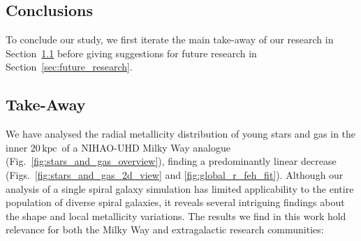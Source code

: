 \documentclass[twocolumn,apj,numberedappendix,appendixfloats,twocolappendix]{openjournal}
\newcommand{\nihaoRmax}{$20\,\mathrm{kpc}$}
\begin{document}
\begin{CJK*}{UTF8}{gbsn}
\section{Conclusions}
\label{sec:conc}

To conclude our study, we first iterate the main take-away of our research in Section~\ref{sec:take_away} before giving suggestions for future research in Section~\ref{sec:future_research}.

\subsection{Take-Away} \label{sec:take_away}

We have analysed the radial metallicity distribution of young stars and gas in the inner \nihaoRmax\ of a NIHAO-UHD Milky Way analogue (Fig.~\ref{fig:stars_and_gas_overview}), finding a predominantly linear decrease (Figs.~\ref{fig:stars_and_gas_2d_view} and \ref{fig:global_r_feh_fit}). Although our analysis of a single spiral galaxy simulation has limited applicability to the entire population of diverse spiral galaxies, it reveals several intriguing findings about the shape and local metallicity variations. The results we find in this work hold relevance for both the Milky Way and extragalactic research communities:


\end{CJK*}
\end{document}
